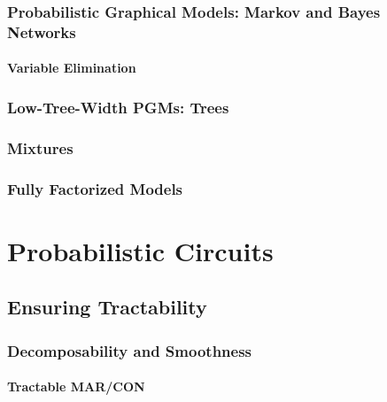 			\subsubsection{Probabilistic Graphical Models: Markov and Bayes Networks} %

				\paragraph{Variable Elimination} %

			\subsubsection{Low-Tree-Width PGMs: Trees} %

			\subsubsection{Mixtures} %

			\subsubsection{Fully Factorized Models} %

	\section{Probabilistic Circuits} %

		\subsection{Ensuring Tractability} %

			\subsubsection{Decomposability and Smoothness} %

				\paragraph{Tractable MAR/CON} %


